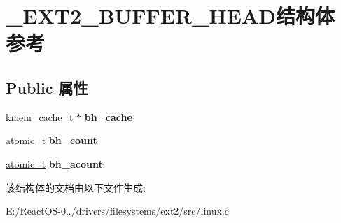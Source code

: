 \hypertarget{struct___e_x_t2___b_u_f_f_e_r___h_e_a_d}{}\section{\+\_\+\+E\+X\+T2\+\_\+\+B\+U\+F\+F\+E\+R\+\_\+\+H\+E\+A\+D结构体 参考}
\label{struct___e_x_t2___b_u_f_f_e_r___h_e_a_d}
\subsection*{Public 属性}
\begin{DoxyCompactItemize}
\item 
\mbox{\label{struct___e_x_t2___b_u_f_f_e_r___h_e_a_d_a31e0bd05c72dbdacb5ef82819bc391f4}} 
\hyperlink{structkmem__cache}{kmem\+\_\+cache\+\_\+t} $\ast$ {\bfseries bh\+\_\+cache}
\item 
\mbox{\label{struct___e_x_t2___b_u_f_f_e_r___h_e_a_d_a67dcc27dc9391aff4221c6e8e003da52}} 
\hyperlink{structatomic__t}{atomic\+\_\+t} {\bfseries bh\+\_\+count}
\item 
\mbox{\label{struct___e_x_t2___b_u_f_f_e_r___h_e_a_d_a1237d06b1093edb4ee6878505034b0d3}} 
\hyperlink{structatomic__t}{atomic\+\_\+t} {\bfseries bh\+\_\+acount}
\end{DoxyCompactItemize}


该结构体的文档由以下文件生成\+:\begin{DoxyCompactItemize}
\item 
E\+:/\+React\+O\+S-\/0../drivers/filesystems/ext2/src/linux.\+c\end{DoxyCompactItemize}
